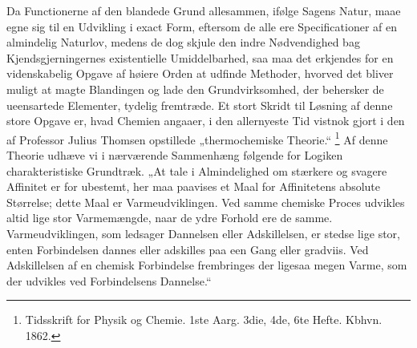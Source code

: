 \documentclass[12pt]{book}
\newcommand{\opage}[1]{\marginnote{\footnotesize\textit{[#1]}}}
\begin{document}
Da Functionerne af den blandede Grund allesammen, ifølge Sagens Natur, maae egne sig
til en Udvikling i exact Form, eftersom de alle ere Specificationer af en almindelig
Naturlov, medens de dog skjule den indre Nødvendighed bag
\opage{327} Kjendsgjerningernes existentielle Umiddelbarhed, saa maa det erkjendes for en
videnskabelig Opgave af høiere Orden at udfinde Methoder, hvorved det bliver muligt at
magte Blandingen og lade den Grundvirksomhed, der behersker de ueensartede Elementer,
tydelig fremtræde. Et stort Skridt til Løsning af denne store Opgave er, hvad Chemien
angaaer, i den allernyeste Tid vistnok gjort i den af Professor Julius Thomsen
opstillede „thermochemiske Theorie.“%
\footnote{Tidsskrift for Physik og Chemie. 1ste Aarg. 3die, 4de, 6te Hefte. Kbhvn. 1862.}
Af denne Theorie udhæve vi i nærværende Sammenhæng følgende for Logiken
charakteristiske Grundtræk. „At tale i Almindelighed om stærkere og svagere Affinitet
er for ubestemt, her maa paavises et Maal for Affinitetens absolute Størrelse; dette
Maal er Varmeudviklingen. Ved samme chemiske Proces udvikles altid lige stor
Varmemængde, naar de ydre Forhold ere de samme. Varmeudviklingen, som ledsager
Dannelsen eller Adskillelsen, er stedse lige stor, enten Forbindelsen dannes eller
adskilles paa een Gang eller gradviis. Ved Adskillelsen af en chemisk Forbindelse
frembringes der ligesaa megen Varme, som der udvikles ved Forbindelsens Dannelse.“
\end{document}
